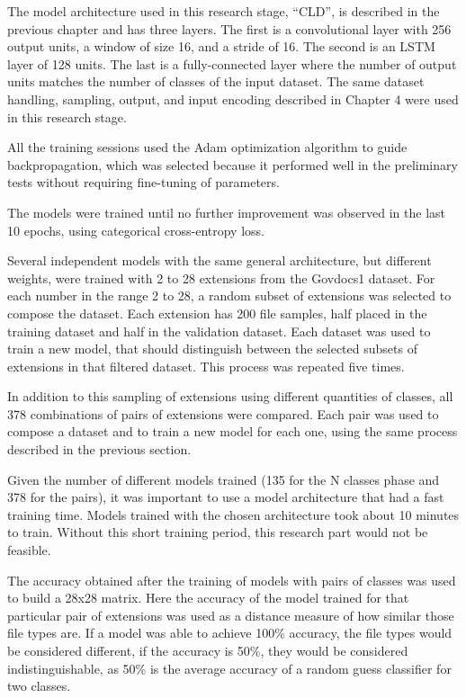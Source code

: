 
The model architecture used in this research stage, ``CLD'', is described in the previous chapter and has three layers. The first is a convolutional layer with 256 output units, a window of size 16, and a stride of 16. The second is an LSTM layer of 128 units. The last is a fully-connected layer where the number of output units matches the number of classes of the input dataset.
The same dataset handling, sampling, output, and input encoding described in Chapter 4 were used in this research stage.

All the training sessions used the Adam \cite{kingma_adam:_2014}
optimization algorithm to guide backpropagation, which was selected because it performed well in the preliminary tests without requiring fine-tuning of parameters.

The models were trained until no further improvement was observed in the last 10 epochs, using categorical cross-entropy loss.

Several independent models with the same general architecture, but different weights, were trained with 2 to 28 extensions from the Govdocs1 dataset. For each number in the range 2 to 28, a random subset of extensions was selected to compose the dataset. Each extension has 200 file samples, half placed in the training dataset and half in the validation dataset. Each dataset was used to train a new model, that should distinguish between the selected subsets of extensions in that filtered dataset. This process was repeated five times.


In addition to this sampling of extensions using different quantities of classes, all 378 combinations of pairs of extensions were compared. Each pair was used to compose a dataset and to train a new model for each one, using the same process described in the previous section.

Given the number of different models trained (135 for the N classes phase and 378 for the pairs), it was important to use a model architecture that had a fast training time. Models trained with the chosen architecture took about 10 minutes to train. Without this short training period, this research part would not be feasible.

The accuracy obtained after the training of models with pairs of classes was used to build a 28x28 matrix. Here the accuracy of the model trained for that particular pair of extensions was used as a distance measure of how similar those file types are. If a model was able to achieve 100\% accuracy, the file types would be considered different, if the accuracy is 50\%, they would be considered indistinguishable, as 50\% is the average accuracy of a random guess classifier for two classes.

